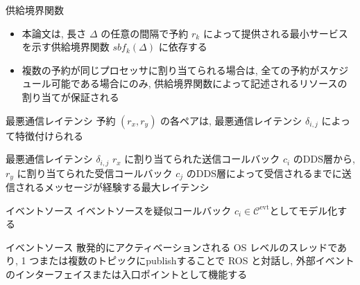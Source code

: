 \begin{frame}{供給境界関数}
    \begin{itemize}
        \item 本論文は, 長さ $\Delta$ の任意の間隔で予約 $r_{k}$ によって提供される最小サービスを示す供給境界関数 $sbf_{k}(\Delta)$ \cite{shin2003periodic, lipari2003resource} に依存する
        \item 複数の予約が同じプロセッサに割り当てられる場合は, 全ての予約がスケジュール可能である場合にのみ, 供給境界関数によって記述されるリソースの割り当てが保証される
    \end{itemize}
\end{frame}

\begin{frame}{最悪通信レイテンシ}
    予約 $\left(r_{x}, r_{y}\right)$ の各ペアは, 最悪通信レイテンシ $\delta_{i, j}$ によって特徴付けられる
    \begin{block}{最悪通信レイテンシ $\delta_{i, j}$}
        $r_x$ に割り当てられた送信コールバック $c_i$ のDDS層から, $r_y$ に割り当てられた受信コールバック $c_j$ のDDS層によって受信されるまでに送信されるメッセージが経験する最大レイテンシ
    \end{block}
\end{frame}

\begin{frame}{イベントソース}
    イベントソースを疑似コールバック $c_{i} \in \mathcal{C}^{\text {evt}}$としてモデル化する
    \begin{block}{イベントソース}
        散発的にアクティベーションされる OS レベルのスレッドであり, 1 つまたは複数のトピックにpublishすることで ROS と対話し, 外部イベントのインターフェイスまたは入口ポイントとして機能する
    \end{block}
\end{frame}
